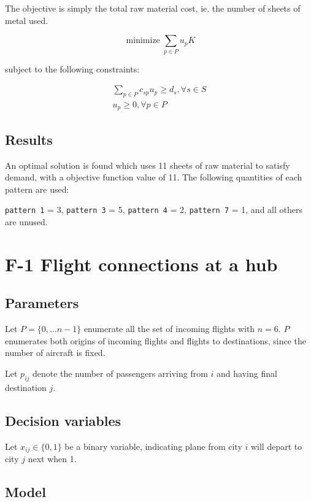 \documentclass[11pt,oneside]{article}
\DeclareMathOperator*{\minimize}{minimize}
\begin{document}
The objective is simply the total raw material cost, ie. the number of sheets
of metal used.

$$
\minimize \sum_{p\in P} u_p K
$$

subject to the following constraints:

\begin{eqnarray}
    \sum_{p\in P} c_{sp}u_p \geq d_{s}, \forall s \in S \\
    u_p \geq 0, \forall p\in P
\end{eqnarray}

\subsection{Results}

An optimal solution is found which uses 11 sheets of raw material to satisfy
demand, with a objective function value of 11. The following quantities of each pattern
are used:

\texttt{pattern 1} = 3,
\texttt{pattern 3} = 5,
\texttt{pattern 4} = 2,
\texttt{pattern 7} = 1,
and all others are unused.

\section{F-1 Flight connections at a hub}

\subsection{Parameters}

Let $P = \lbrace 0, \ldots n-1\rbrace$ enumerate all the set of incoming flights
with $n=6$. $P$ enumerates both origins of incoming flights and flights to
destinations, since the number of aircraft is fixed.

Let $p_{ij}$ denote the number of passengers arriving from $i$ and having final
destination $j$.

\subsection{Decision variables}

Let $x_{ij}\in \lbrace 0, 1\rbrace$ be a binary variable, indicating plane
from city $i$ will depart to city $j$ next when 1.

\subsection{Model}
\end{document}
